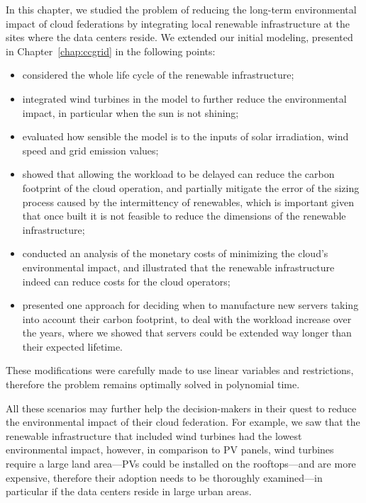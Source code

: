 In this chapter, we studied the problem of reducing the long-term environmental impact of cloud federations by integrating local renewable infrastructure at the sites where the data centers reside. We extended our initial modeling, presented in Chapter~\ref{chap:ccgrid} in the following points: 
\begin{itemize}
    \item considered the whole life cycle of the renewable infrastructure; 
    \item integrated wind turbines in the model to further reduce the environmental impact, in particular when the sun is not shining;
    \item evaluated how sensible the model is to the inputs of solar irradiation, wind speed and grid emission values;
    \item showed that allowing the workload to be delayed can reduce the carbon footprint of the cloud operation, and partially mitigate the error of the sizing process caused by the intermittency of renewables, which is important given that once built it is not feasible to reduce the dimensions of the renewable infrastructure;
    \item conducted an analysis of the monetary costs of minimizing the cloud's  environmental impact, and illustrated that the renewable infrastructure indeed can reduce costs for the cloud operators;
    \item presented one approach for deciding when to manufacture new servers taking into account their carbon footprint, to deal with the workload increase over the years, where we showed that servers could be extended way longer than their expected lifetime. 
\end{itemize}

These modifications were carefully made to use linear variables and restrictions, therefore the problem remains optimally solved in polynomial time.

All these scenarios may further help the decision-makers in their quest to reduce the environmental impact of their cloud federation. For example, we saw that the renewable infrastructure that included wind turbines had the lowest environmental impact, however, in comparison to PV panels, wind turbines require a large land area---PVs could be installed on the rooftops---and are more expensive, therefore their adoption needs to be thoroughly examined---in particular if the data centers reside in large urban areas. 

